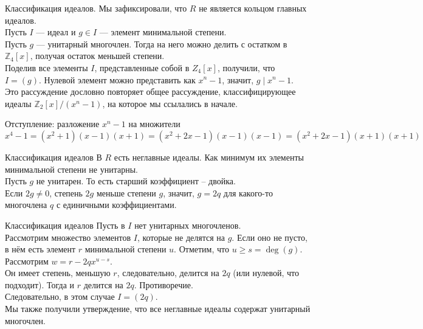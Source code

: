 \documentclass[10pt]{beamer}
\begin{document}
\begin{frame}{Классификация идеалов.}
  Мы зафиксировали, что $R$ не является кольцом главных идеалов.\\
  \vspace{0.4cm}
  Пусть $I$ --- идеал и $g \in I$ --- элемент минимальной степени.\\
  \pause
  \vspace{0.4cm}
  Пусть $g$ --- унитарный многочлен. Тогда на него можно делить с остатком в $\mathbb{Z}_4[x]$, получая остаток меньшей степени.\\
  \vspace{0.4cm}
  Поделив все элементы $I$, представленные собой в $Z_4[x]$, получили, что $I = (g)$.
  Нулевой элемент можно представить как $x^n-1$, значит, $g \;|\; x^n-1$.\\
  \vspace{0.6cm}
  Это рассуждение дословно повторяет общее рассуждение, классифицирующее идеалы $\mathbb{Z}_2[x]/(x^n-1)$, на которое мы ссылались в начале.
  
\end{frame}

\begin{frame}{Отступление: разложение $x^n-1$ на множители}
    $x^4-1 = (x^2+1)(x-1)(x+1) = (x^2+2x-1)(x-1)(x-1) = (x^2+2x-1)(x+1)(x+1)$
\end{frame}

\begin{frame}{Классификация идеалов}
  В $R$ есть неглавные идеалы. Как минимум их элементы минимальной степени не унитарны.\\
  \vspace{0.4cm}
  Пусть $g$ не унитарен. То есть старший коэффициент -- двойка.\\
  Если $2g \neq 0$, степень $2g$ меньше степени $g$, значит, $g = 2q$ для какого-то многочлена $q$ с единичными коэффициентами.  
\end{frame}


\begin{frame}{Классификация идеалов}
  Пусть в $I$ нет унитарных многочленов.\\
  \vspace{0.3cm}
  Рассмотрим множество элементов $I$, которые не делятся на $g$. Если оно не пусто, в нём есть элемент $r$ минимальной степени $u$. Отметим, что $u \geq s  = \operatorname{deg}(g)$. Рассмотрим $w = r - 2qx^{u-s}$.\\
  \vspace{0.3cm}
  Он имеет степень, меньшую $r$, следовательно, делится на $2q$ (или нулевой, что подходит). Тогда и $r$ делится на $2q$. Противоречие.\\
  \vspace{0.5cm}
  Следовательно, в этом случае $I = (2q)$.\\
  Мы также получили утверждение, что все неглавные идеалы содержат унитарный многочлен.
\end{frame}
\end{document}
